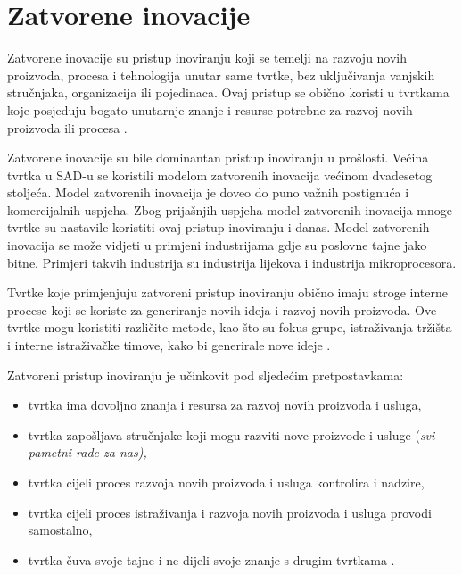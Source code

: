 \chapter{Zatvorene inovacije} \label{ch:zatvorene_inovacije}

Zatvorene inovacije su pristup inoviranju koji se temelji na razvoju novih
proizvoda, procesa i tehnologija unutar same tvrtke, bez uključivanja vanjskih
stručnjaka, organizacija ili pojedinaca. Ovaj pristup se obično koristi u
tvrtkama koje posjeduju bogato unutarnje znanje i resurse potrebne za razvoj
novih proizvoda ili procesa \citep{zatvorenaotvorena2020,openinnovation2003}.

Zatvorene inovacije su bile dominantan pristup inoviranju u prošlosti. Većina
tvrtka u SAD-u se koristili modelom zatvorenih inovacija većinom dvadesetog
stoljeća. Model zatvorenih inovacija je doveo do puno važnih postignuća i
komercijalnih uspjeha. Zbog prijašnjih uspjeha model zatvorenih inovacija mnoge
tvrtke su nastavile koristiti ovaj pristup inoviranju i danas. Model zatvorenih
inovacija se može vidjeti u primjeni industrijama gdje su poslovne tajne jako
bitne. Primjeri takvih industrija su industrija lijekova i industrija
mikroprocesora.


Tvrtke koje primjenjuju zatvoreni pristup inoviranju obično imaju stroge interne
procese koji se koriste za generiranje novih ideja i razvoj novih proizvoda. Ove
tvrtke mogu koristiti različite metode, kao što su fokus grupe, istraživanja
tržišta i interne istraživačke timove, kako bi generirale nove ideje
\citep{zatvorenaotvorena2020,openinnovation2003}.

Zatvoreni pristup inoviranju je učinkovit pod sljedećim pretpostavkama:
\begin{itemize}
    \item tvrtka ima dovoljno znanja i resursa za razvoj novih proizvoda i usluga,
    \item tvrtka zapošljava stručnjake koji mogu razviti nove proizvode i usluge (\it{svi pametni rade za nas}),
    \item tvrtka cijeli proces razvoja novih proizvoda i usluga kontrolira i nadzire,
    \item tvrtka cijeli proces istraživanja i razvoja novih proizvoda i usluga provodi samostalno,
    \item tvrtka čuva svoje tajne i ne dijeli svoje znanje s drugim tvrtkama \citep{zatvorenaotvorena2020,openinnovation2003}.
\end{itemize}

